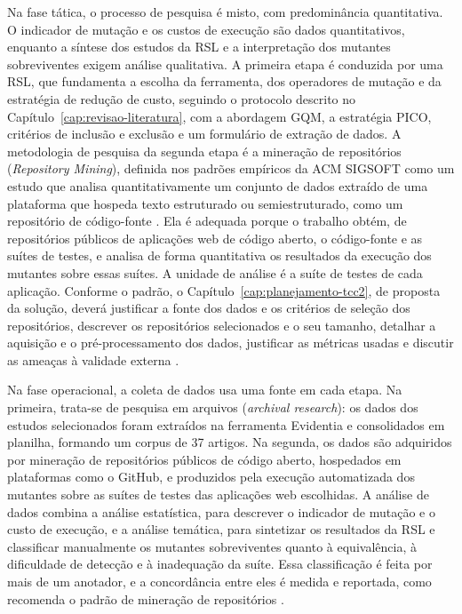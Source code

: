 Na fase tática, o processo de pesquisa é misto, com predominância quantitativa. O indicador de mutação e os custos de execução são dados quantitativos, enquanto a síntese dos estudos da RSL e a interpretação dos mutantes sobreviventes exigem análise qualitativa. A primeira etapa é conduzida por uma RSL, que fundamenta a escolha da ferramenta, dos operadores de mutação e da estratégia de redução de custo, seguindo o protocolo descrito no Capítulo~\ref{cap:revisao-literatura}, com a abordagem GQM, a estratégia PICO, critérios de inclusão e exclusão e um formulário de extração de dados. A metodologia de pesquisa da segunda etapa é a mineração de repositórios (\textit{Repository Mining}), definida nos padrões empíricos da ACM SIGSOFT como um estudo que analisa quantitativamente um conjunto de dados extraído de uma plataforma que hospeda texto estruturado ou semiestruturado, como um repositório de código-fonte \cite{acmsigsoft}. Ela é adequada porque o trabalho obtém, de repositórios públicos de aplicações web de código aberto, o código-fonte e as suítes de testes, e analisa de forma quantitativa os resultados da execução dos mutantes sobre essas suítes. A unidade de análise é a suíte de testes de cada aplicação. Conforme o padrão, o Capítulo~\ref{cap:planejamento-tcc2}, de proposta da solução, deverá justificar a fonte dos dados e os critérios de seleção dos repositórios, descrever os repositórios selecionados e o seu tamanho, detalhar a aquisição e o pré-processamento dos dados, justificar as métricas usadas e discutir as ameaças à validade externa \cite{acmsigsoft}.

Na fase operacional, a coleta de dados usa uma fonte em cada etapa. Na primeira, trata-se de pesquisa em arquivos (\textit{archival research}): os dados dos estudos selecionados foram extraídos na ferramenta Evidentia e consolidados em planilha, formando um corpus de 37 artigos. Na segunda, os dados são adquiridos por mineração de repositórios públicos de código aberto, hospedados em plataformas como o GitHub, e produzidos pela execução automatizada dos mutantes sobre as suítes de testes das aplicações web escolhidas. A análise de dados combina a análise estatística, para descrever o indicador de mutação e o custo de execução, e a análise temática, para sintetizar os resultados da RSL e classificar manualmente os mutantes sobreviventes quanto à equivalência, à dificuldade de detecção e à inadequação da suíte. Essa classificação é feita por mais de um anotador, e a concordância entre eles é medida e reportada, como recomenda o padrão de mineração de repositórios \cite{acmsigsoft}.


